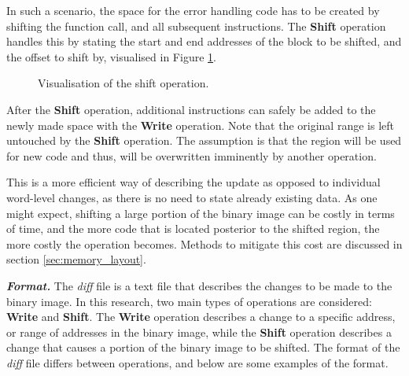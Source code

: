 In such a scenario, the space for the error handling code has to be created by shifting the function call, and all subsequent instructions. The \textbf{Shift} operation handles this by stating the start and end addresses of the block to be shifted, and the offset to shift by, visualised in Figure \ref{fig:shift_example}. 
\begin{figure}[!ht]
    \begin{shaded}
        \centering
        {
            \setlength{\fboxsep}{0pt}%
            \setlength{\fboxrule}{0.5pt}%
        }
        \caption{Visualisation of the shift operation.}
        \label{fig:shift_example}
    \end{shaded}
\end{figure}
After the \textbf{Shift} operation, additional instructions can safely be added to the newly made space with the \textbf{Write} operation. Note that the original range is left untouched by the \textbf{Shift} operation. The assumption is that the region will be used for new code and thus, will be overwritten imminently by another operation.

This is a more efficient way of describing the update as opposed to individual word-level changes, as there is no need to state already existing data. As one might expect, shifting a large portion of the binary image can be costly in terms of time, and the more code that is located posterior to the shifted region, the more costly the operation becomes. Methods to mitigate this cost are discussed in section \ref{sec:memory_layout}.

\textbf{\textit{Format.}} 
The \textit{diff} file is a text file that describes the changes to be made to the binary image. In this research, two main types of operations are considered: \textbf{Write} and \textbf{Shift}. The \textbf{Write} operation describes a change to a specific address, or range of addresses in the binary image, while the \textbf{Shift} operation describes a change that causes a portion of the binary image to be shifted. The format of the \textit{diff} file differs between operations, and below are some examples of the format.

